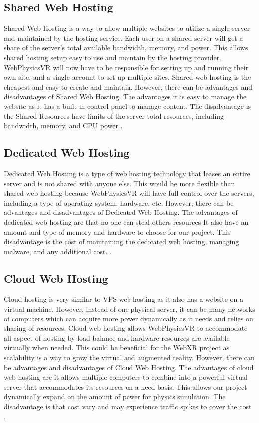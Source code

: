 \subsection{Shared Web Hosting}
Shared Web Hosting is a way to allow multiple websites to utilize a single server and maintained by the hosting service. Each user on a shared server will get a share of the server's total available bandwidth, memory, and power\cite{types_of_web_hosting}. This allows shared hosting setup easy to use and maintain by the hosting provider. WebPhysicsVR will now have to be responsible for setting up and running their own site, and a single account to set up multiple sites. Shared web hosting is the cheapest and easy to create and maintain. However, there can be advantages and disadvantages of Shared Web Hosting. The advantages it is easy to manage the website as it has a built-in control panel to manage content. The disadvantage is the Shared Resources have limits of the server total resources, including bandwidth, memory, and CPU power \cite{types_of_web_hosting}.

\subsection{Dedicated Web Hosting}
Dedicated Web Hosting is a type of web hosting technology that leases an entire server and is not shared with anyone else. This would be more flexible than shared web hosting because WebPhysicsVR will have full control over the servers, including a type of operating system, hardware, etc. However, there can be advantages and disadvantages of Dedicated Web Hosting. The advantages of dedicated web hosting are that no one can steal others resources It also have an amount and type of memory and hardware to choose for our project. This disadvantage is the cost of maintaining the dedicated web hosting, managing malware, and any additional cost. \cite{types_of_web_hosting}.

\subsection{Cloud Web Hosting}
Cloud hosting is very similar to VPS web hosting as it also has a website on a virtual machine. However, instead of one physical server, it can be many networks of computers which can acquire more power dynamically as it needs and relies on sharing of resources. Cloud web hosting allows WebPhysicsVR to accommodate all aspect of hosting by load balance and hardware resources are available virtually when needed. This could  be beneficial for the WebXR project as scalability is a way to grow the virtual and augmented reality. However, there can be advantages and disadvantages of Cloud Web Hosting. The advantages of cloud web hosting are it allows multiple computers to combine into a powerful virtual server that accommodates its resources on a need basis. This allows our project dynamically expand on the amount of power for physics simulation. The disadvantage is that cost vary and may experience traffic spikes to cover the cost \cite{types_of_web_hosting}.


